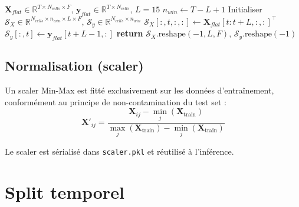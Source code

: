 \documentclass[12pt,a4paper]{report}
\begin{document}
\begin{algorithm}
\caption{Construction des séquences glissantes}
\begin{algorithmic}[1]
\Require $\mathbf{X}_{flat} \in \mathbb{R}^{T \times N_{cells} \times F}$,
         $\mathbf{y}_{flat} \in \mathbb{R}^{T \times N_{cells}}$, $L=15$
\State $n_{win} \leftarrow T - L + 1$
\State Initialiser $\mathcal{S}_X \in \mathbb{R}^{N_{cells} \times n_{win} \times L \times F}$,
       $\mathcal{S}_y \in \mathbb{R}^{N_{cells} \times n_{win}}$
  \State $\mathcal{S}_X[:, t, :, :] \leftarrow \mathbf{X}_{flat}[t:t+L, :, :]^{\top}$
  \State $\mathcal{S}_y[:, t] \leftarrow \mathbf{y}_{flat}[t+L-1, :]$
\EndFor
\State \textbf{return} $\mathcal{S}_X.\text{reshape}(-1, L, F)$, $\mathcal{S}_y.\text{reshape}(-1)$
\end{algorithmic}
\end{algorithm}

\subsection{Normalisation (scaler)}

Un scaler Min-Max est fitté exclusivement sur les données d'entraînement, conformément
au principe de non-contamination du test set :
\begin{equation}
  \mathbf{X}'_{ij} = \frac{\mathbf{X}_{ij} - \min_j(\mathbf{X}_\text{train})}
                          {\max_j(\mathbf{X}_\text{train}) - \min_j(\mathbf{X}_\text{train})}
  \label{eq:scaler}
\end{equation}

Le scaler est sérialisé dans \texttt{scaler.pkl} et réutilisé à l'inférence.

\section{Split temporel}

\begin{center}
\end{center}
\end{document}
